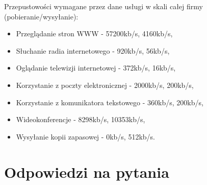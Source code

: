 \documentclass[12pt,a4paper,titlepage]{article}
\begin{document}
Przepustowości wymagane przez dane usługi w skali całej firmy (pobieranie/wysyłanie):
\begin{itemize}
    \item Przeglądanie stron WWW - 57200kb/s, 4160kb/s,
    \item Słuchanie radia internetowego - 920kb/s, 56kb/s,
    \item Oglądanie telewizji internetowej - 372kb/s, 16kb/s,
    \item Korzystanie z poczty elektronicznej - 2000kb/s, 200kb/s,
    \item Korzystanie z komunikatora tekstowego - 360kb/s, 200kb/s,
    \item Wideokonferencje - 8298kb/s, 10353kb/s,
    \item Wysyłanie kopii zapasowej - 0kb/s, 512kb/s.
\end{itemize}

\section{Odpowiedzi na pytania}
\end{document}
